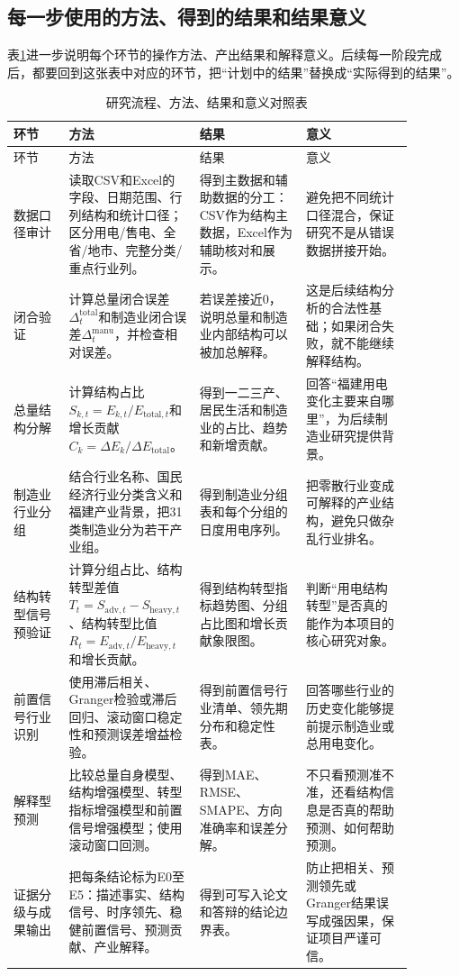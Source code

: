 \documentclass[UTF8,a4paper,11pt]{ctexart}
\newcommand{\manu}{\mathrm{manu}}
\newcommand{\heavy}{\mathrm{heavy}}
\newcommand{\adv}{\mathrm{adv}}
\begin{document}
\subsection{每一步使用的方法、得到的结果和结果意义}

表\ref{tab:route-method-result}进一步说明每个环节的操作方法、产出结果和解释意义。后续每一阶段完成后，都要回到这张表中对应的环节，把“计划中的结果”替换成“实际得到的结果”。

\begin{longtable}{p{0.13\linewidth}p{0.25\linewidth}p{0.25\linewidth}p{0.25\linewidth}}
\caption{研究流程、方法、结果和意义对照表}
\label{tab:route-method-result}\\
\toprule
环节 & 方法 & 结果 & 意义 \\
\midrule
\endfirsthead
\toprule
环节 & 方法 & 结果 & 意义 \\
\midrule
\endhead
数据口径审计 &
读取CSV和Excel的字段、日期范围、行列结构和统计口径；区分用电/售电、全省/地市、完整分类/重点行业列。 &
得到主数据和辅助数据的分工：CSV作为结构主数据，Excel作为辅助核对和展示。 &
避免把不同统计口径混合，保证研究不是从错误数据拼接开始。\\
\midrule
闭合验证 &
计算总量闭合误差
$\Delta^{\mathrm{total}}_t$和制造业闭合误差$\Delta^{\manu}_t$，并检查相对误差。 &
若误差接近0，说明总量和制造业内部结构可以被加总解释。 &
这是后续结构分析的合法性基础；如果闭合失败，就不能继续解释结构。\\
\midrule
总量结构分解 &
计算结构占比$S_{k,t}=E_{k,t}/E_{\mathrm{total},t}$和增长贡献$C_k=\Delta E_k/\Delta E_{\mathrm{total}}$。 &
得到一二三产、居民生活和制造业的占比、趋势和新增贡献。 &
回答“福建用电变化主要来自哪里”，为后续制造业研究提供背景。\\
\midrule
制造业行业分组 &
结合行业名称、国民经济行业分类含义和福建产业背景，把31类制造业分为若干产业组。 &
得到制造业分组表和每个分组的日度用电序列。 &
把零散行业变成可解释的产业结构，避免只做杂乱行业排名。\\
\midrule
结构转型信号预验证 &
计算分组占比、结构转型差值$T_t=S_{\adv,t}-S_{\heavy,t}$、结构转型比值$R_t=E_{\adv,t}/E_{\heavy,t}$和增长贡献。 &
得到结构转型指标趋势图、分组占比图和增长贡献象限图。 &
判断“用电结构转型”是否真的能作为本项目的核心研究对象。\\
\midrule
前置信号行业识别 &
使用滞后相关、Granger检验或滞后回归、滚动窗口稳定性和预测误差增益检验。 &
得到前置信号行业清单、领先期分布和稳定性表。 &
回答哪些行业的历史变化能够提前提示制造业或总用电变化。\\
\midrule
解释型预测 &
比较总量自身模型、结构增强模型、转型指标增强模型和前置信号增强模型；使用滚动窗口回测。 &
得到MAE、RMSE、SMAPE、方向准确率和误差分解。 &
不只看预测准不准，还看结构信息是否真的帮助预测、如何帮助预测。\\
\midrule
证据分级与成果输出 &
把每条结论标为E0至E5：描述事实、结构信号、时序领先、稳健前置信号、预测贡献、产业解释。 &
得到可写入论文和答辩的结论边界表。 &
防止把相关、预测领先或Granger结果误写成强因果，保证项目严谨可信。\\
\bottomrule
\end{longtable}
\end{document}
